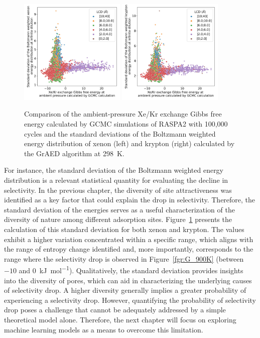 \documentclass[main]{subfiles}
\begin{document}
\begin{figure}[ht]
  \centering
    \includegraphics[width=0.45\textwidth]{figures/3-fastsim/G_2080_vs_enthalpy_std_x_overview.jpg}
    \hfill
    \includegraphics[width=0.45\textwidth]{figures/3-fastsim/G_2080_vs_enthalpy_std_y_overview.jpg}
        \caption{Comparison of the ambient-pressure Xe/Kr exchange Gibbs free energy calculated by GCMC simulations of RASPA2 with 100,000 cycles and the standard deviations of the Boltzmann weighted energy distribution of xenon (left) and krypton (right) calculated by the GrAED algorithm at \SI{298}{\kelvin}.}\label{fgr:enthalpy_std}
\end{figure}

For instance, the standard deviation of the Boltzmann weighted energy distribution is a relevant statistical quantity for evaluating the decline in selectivity. In the previous chapter, the diversity of site attractiveness was identified as a key factor that could explain the drop in selectivity. Therefore, the standard deviation of the energies serves as a useful characterization of the diversity of nature among different adsorption sites. Figure~\ref{fgr:enthalpy_std} presents the calculation of this standard deviation for both xenon and krypton. The values exhibit a higher variation concentrated within a specific range, which aligns with the range of entropy change identified and, more importantly, corresponds to the range where the selectivity drop is observed in Figure~\ref{fgr:G_900K} (between $-10$ and $0$~\si{\kilo\joule\per\mole}). Qualitatively, the standard deviation provides insights into the diversity of pores, which can aid in characterizing the underlying causes of selectivity drop. A higher diversity generally implies a greater probability of experiencing a selectivity drop. However, quantifying the probability of selectivity drop poses a challenge that cannot be adequately addressed by a simple theoretical model alone. Therefore, the next chapter will focus on exploring machine learning models as a means to overcome this limitation.
\end{document}
